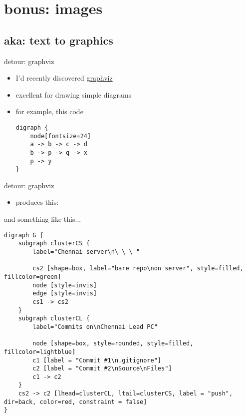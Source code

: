 \documentclass{beamer}
\begin{document}
\section{bonus: images}

\subsection{aka: text to graphics}

\begin{frame}[fragile]{detour: graphviz}

\begin{itemize}
\item
I'd recently discovered \href{http://www.graphviz.org/}{graphviz}
\item
excellent for drawing simple diagrams
\item
for example, this code

\begin{verbatim}
digraph {
    node[fontsize=24]
    a -> b -> c -> d
    b -> p -> q -> x
    p -> y
}

\end{verbatim}

\end{itemize}



\end{frame}

\begin{frame}{detour: graphviz}

\begin{itemize}
\item
produces this:
\end{itemize}




\end{frame}

\begin{frame}[fragile]{and something like this...}

\tiny

\begin{verbatim}
digraph G {
    subgraph clusterCS {
        label="Chennai server\n\ \ \ "

        cs2 [shape=box, label="bare repo\non server", style=filled, fillcolor=green]
        node [style=invis]
        edge [style=invis]
        cs1 -> cs2
    }
    subgraph clusterCL {
        label="Commits on\nChennai Lead PC"

        node [shape=box, style=rounded, style=filled, fillcolor=lightblue]
        c1 [label = "Commit #1\n.gitignore"]
        c2 [label = "Commit #2\nSource\nFiles"]
        c1 -> c2
    }
    cs2 -> c2 [lhead=clusterCL, ltail=clusterCS, label = "push", dir=back, color=red, constraint = false]
}

\end{verbatim}




\end{frame}
\end{document}

